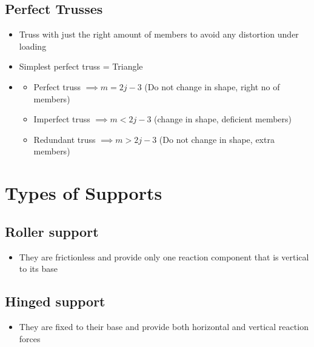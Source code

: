 \documentclass[8pt]{report}
\begin{document}
\subsection{Perfect Trusses}
	\begin{itemize}
		\item Truss with just the right amount of members to avoid any distortion under loading
		\item Simplest perfect truss = Triangle
		\item {}
		\begin{itemize}
			\item Perfect truss $\implies m = 2j-3$ (Do not change in shape, right no of members)
			\item Imperfect truss $\implies m < 2j-3$ (change in shape, deficient members)
			\item Redundant truss $\implies m > 2j-3$ (Do not change in shape, extra members)
		\end{itemize}
	\end{itemize}\hrulefill
\section{Types of Supports}
\subsection{Roller support}
	\begin{itemize}
		\item They are frictionless and provide only one reaction component that is vertical to its base
	\end{itemize}\hrulefill
\subsection{Hinged support}
	\begin{itemize}
		\item They are fixed to their base and provide both horizontal and vertical reaction forces
	\end{itemize}\hrulefill
\end{document}
